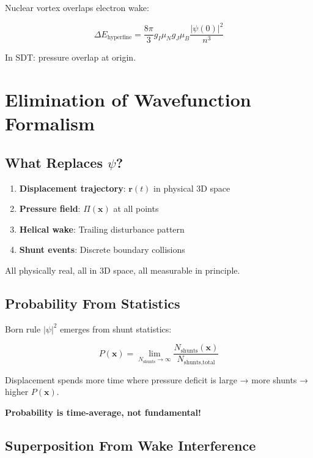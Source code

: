Nuclear vortex overlaps electron wake:

\begin{equation}
\Delta E_{\text{hyperfine}} = \frac{8\pi}{3} g_I \mu_N g_J \mu_B \frac{|\psi(0)|^2}{n^3}
\end{equation}

In SDT: pressure overlap at origin.

\section{Elimination of Wavefunction Formalism}

\subsection{What Replaces $\psi$?}

\begin{enumerate}
\item \textbf{Displacement trajectory}: $\mathbf{r}(t)$ in physical 3D space
\item \textbf{Pressure field}: $\Pi(\mathbf{x})$ at all points
\item \textbf{Helical wake}: Trailing disturbance pattern
\item \textbf{Shunt events}: Discrete boundary collisions
\end{enumerate}

All physically real, all in 3D space, all measurable in principle.

\subsection{Probability From Statistics}

Born rule $|\psi|^2$ emerges from shunt statistics:

\begin{equation}
P(\mathbf{x}) = \lim_{N_{\text{shunts}} \to \infty} \frac{N_{\text{shunts}}(\mathbf{x})}{N_{\text{shunts,total}}}
\end{equation}

Displacement spends more time where pressure deficit is large → more shunts → higher $P(\mathbf{x})$.

\textbf{Probability is time-average, not fundamental!}

\subsection{Superposition From Wake Interference}

